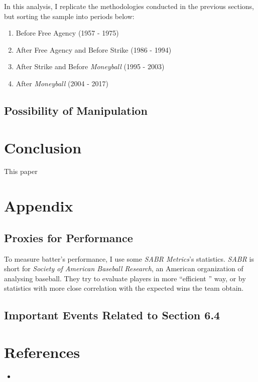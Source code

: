 \documentclass[dvipdfmx, 12pt]{article}
\begin{document}
In this analysis, I replicate the methodologies conducted in the previous sections, but sorting the sample into periods below:

\begin{enumerate}
  \item Before Free Agency (1957 - 1975)

  \item After Free Agency and Before Strike (1986 - 1994)

  \item After Strike and Before \textit{Moneyball} (1995 - 2003)

  \item After \textit{Moneyball} (2004 - 2017)
\end{enumerate}

\subsection{Possibility of Manipulation}

\section{Conclusion}

This paper

\section{Appendix}

\subsection{Proxies for Performance}
\small

To measure batter's performance, I use some \textit{SABR Metrics}'s statistics. \textit{SABR} is short for \textit{Society of American Baseball Research}, an American organization of analysing baseball. They try to evaluate players in more ``efficient '' way,  or by statistics with more close correlation with the expected wins the team obtain.

\subsection{Important Events Related to Section 6.4}


\section{References}
\small
\begin{itemize}
  \item
\end{itemize}
\end{document}

